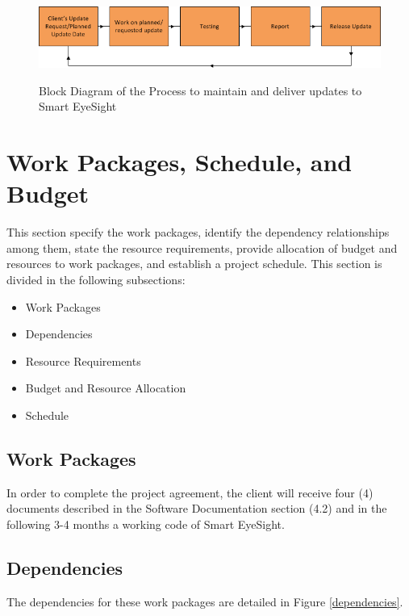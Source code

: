 \documentclass[12pt]{article}
\begin{document}
\begin{figure}[H]\centering
  \includegraphics[width=6.0in]{images/project_support}\\
  \caption{Block Diagram of the Process to maintain and deliver updates to Smart EyeSight}\label{support}
  \end{figure}

\section{Work Packages, Schedule, and Budget}
This section specify the work packages, identify the dependency relationships among them, state the resource requirements, provide allocation of budget and resources to work packages, and establish a project schedule. This section is divided in the following subsections:
\begin{itemize}
  \item Work Packages
  \item Dependencies
  \item Resource Requirements
  \item Budget and Resource Allocation
  \item Schedule
\end{itemize}

\subsection{Work Packages}
In order to complete the project agreement, the client will receive four (4) documents described in the Software Documentation section (4.2) and in the following 3-4 months a working code of Smart EyeSight.

\subsection{Dependencies}
The dependencies for these work packages are detailed in Figure \ref{dependencies}.
\end{document}
